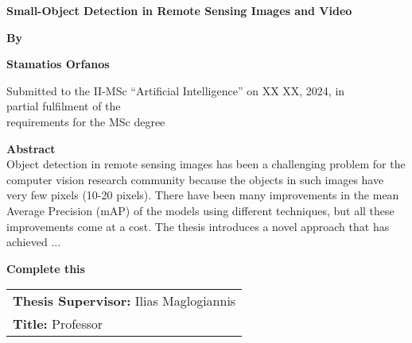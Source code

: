 




\begin{center}
    \textbf{\Large Small-Object Detection in Remote Sensing Images and Video}
\end{center}

\vspace{0.05in}

\begin{center}
    \textbf{\large By}
\end{center}

\vspace{0.05in}

\begin{center}
    \textbf{\large Stamatios Orfanos}
\end{center}

\vspace{0.05in}

\begin{center}
    Submitted to the II-MSc “Artificial Intelligence” on XX XX, 2024, in \\
    partial fulfilment of the \\
    requirements for the MSc degree
\end{center}





\vspace{1cm}

\textbf{\Large Abstract} \\
Object detection in remote sensing images has been a challenging problem for the computer vision research community because the objects in such images have 
very few pixels (10-20 pixels). There have been many improvements in the mean Average Precision (mAP) of the models using different techniques, but all these 
improvements come at a cost. The thesis introduces a novel approach that has achieved ... 

\textbf{Complete this}


\vspace{3.95in}


\begin{tabular}{l}
    \textbf{Thesis Supervisor:} Ilias Maglogiannis \\
    \textbf{Title:} Professor
\end{tabular}


